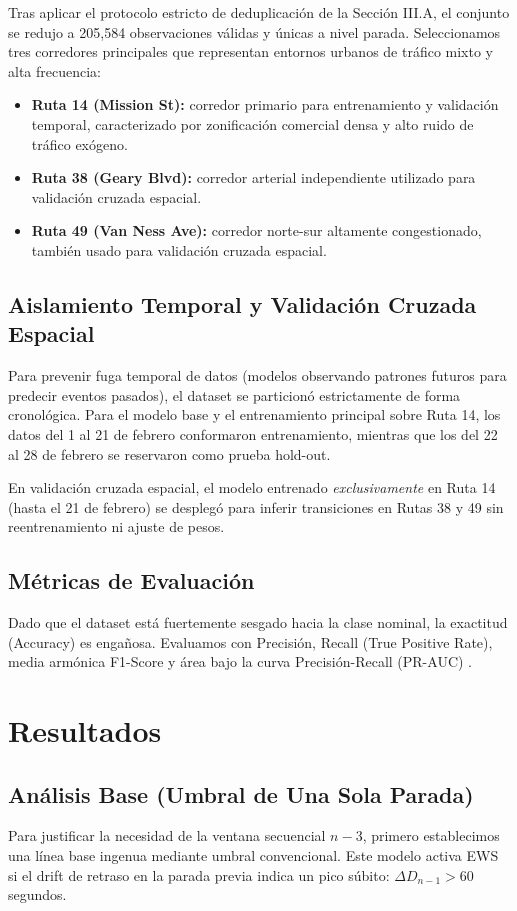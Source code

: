 \documentclass[journal,twocolumn]{IEEEtran}
\begin{document}
Tras aplicar el protocolo estricto de deduplicación de la Sección III.A, el conjunto se redujo a 205,584 observaciones válidas y únicas a nivel parada. Seleccionamos tres corredores principales que representan entornos urbanos de tráfico mixto y alta frecuencia:
\begin{itemize}
	\item \textbf{Ruta 14 (Mission St):} corredor primario para entrenamiento y validación temporal, caracterizado por zonificación comercial densa y alto ruido de tráfico exógeno.
	\item \textbf{Ruta 38 (Geary Blvd):} corredor arterial independiente utilizado para validación cruzada espacial.
	\item \textbf{Ruta 49 (Van Ness Ave):} corredor norte-sur altamente congestionado, también usado para validación cruzada espacial.
\end{itemize}

\subsection{Aislamiento Temporal y Validación Cruzada Espacial}
Para prevenir fuga temporal de datos (modelos observando patrones futuros para predecir eventos pasados), el dataset se particionó estrictamente de forma cronológica. Para el modelo base y el entrenamiento principal sobre Ruta 14, los datos del 1 al 21 de febrero conformaron entrenamiento, mientras que los del 22 al 28 de febrero se reservaron como prueba hold-out.

En validación cruzada espacial, el modelo entrenado \textit{exclusivamente} en Ruta 14 (hasta el 21 de febrero) se desplegó para inferir transiciones en Rutas 38 y 49 sin reentrenamiento ni ajuste de pesos.

\subsection{Métricas de Evaluación}
Dado que el dataset está fuertemente sesgado hacia la clase nominal, la exactitud (Accuracy) es engañosa. Evaluamos con Precisión, Recall (True Positive Rate), media armónica F1-Score y área bajo la curva Precisión-Recall (PR-AUC) \cite{17}.

\section{Resultados}

\subsection{Análisis Base (Umbral de Una Sola Parada)}
Para justificar la necesidad de la ventana secuencial $n-3$, primero establecimos una línea base ingenua mediante umbral convencional. Este modelo activa EWS si el drift de retraso en la parada previa indica un pico súbito: $\Delta D_{n-1} > 60$ segundos.
\end{document}
